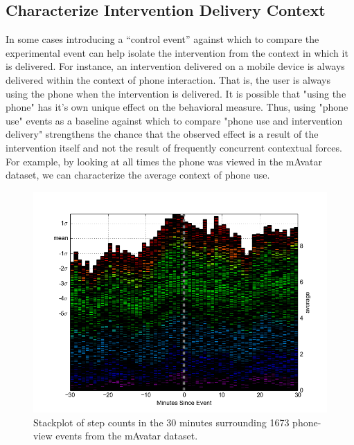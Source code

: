 \subsection{Characterize Intervention Delivery Context}
In some cases introducing a “control event” against which to compare the experimental event can help isolate the intervention from the context in which it is delivered.
For instance, an intervention delivered on a mobile device is always delivered within the context of phone interaction.
That is, the user is always using the phone when the intervention is delivered.
It is possible that "using the phone" has it's own unique effect on the behavioral measure.
Thus, using "phone use" events as a baseline against which to compare "phone use and intervention delivery" strengthens the chance that the observed effect is a result of the intervention itself and not the result of frequently concurrent contextual forces. 
For example, by looking at all times the phone was viewed in the mAvatar dataset, we can characterize the average context of phone use.

\begin{figure}
\centering
\includegraphics[width=0.9\columnwidth]{./img/mAvatarViews_1673_wOverlap.png}
\caption{Stackplot of step counts in the 30 minutes surrounding 1673 phone-view events from the mAvatar dataset.}
\label{fig:mAvatarPhoneContext}
\end{figure}

